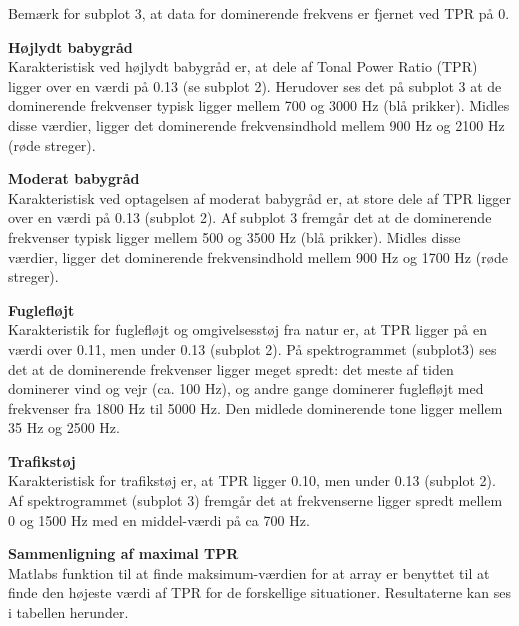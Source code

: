 Bemærk for subplot 3, at data for dominerende frekvens er fjernet ved TPR på 0.


\textbf{Højlydt babygråd} \\
Karakteristisk ved højlydt babygråd er, at dele af Tonal Power Ratio (TPR) ligger over en værdi på 0.13 (se subplot 2). Herudover ses det på subplot 3 at de dominerende frekvenser typisk ligger mellem 700 og 3000 Hz (blå prikker). Midles disse værdier, ligger det dominerende frekvensindhold mellem 900 Hz og 2100 Hz (røde streger). 



\newpage
\textbf{Moderat babygråd}\\
Karakteristisk ved optagelsen af moderat babygråd er, at store dele af TPR ligger over en værdi på 0.13 (subplot 2). Af subplot 3 fremgår det at de dominerende frekvenser typisk ligger mellem 500 og 3500 Hz (blå prikker). Midles disse værdier, ligger det dominerende frekvensindhold mellem 900 Hz og 1700 Hz (røde streger). 



\newpage
\textbf{Fuglefløjt}\\
Karakteristik for fuglefløjt og omgivelsesstøj fra natur er, at TPR ligger på en værdi over 0.11, men under 0.13 (subplot 2). På spektrogrammet (subplot3) ses det at de dominerende frekvenser ligger meget spredt: det meste af tiden dominerer vind og vejr (ca. 100 Hz), og andre gange dominerer fuglefløjt med frekvenser fra 1800 Hz til 5000 Hz. Den midlede dominerende tone ligger mellem 35 Hz og 2500 Hz.


\newpage
\textbf{Trafikstøj}\\
Karakteristisk for trafikstøj er, at TPR ligger 0.10, men under 0.13 (subplot 2). Af spektrogrammet (subplot 3) fremgår det at frekvenserne ligger spredt mellem 0 og 1500 Hz med en middel-værdi på ca 700 Hz.


\newpage
\textbf{Sammenligning af maximal TPR}	\\
Matlabs funktion til at finde maksimum-værdien for at array er benyttet til at finde den højeste værdi af TPR for de forskellige situationer. Resultaterne kan ses i tabellen herunder. 

